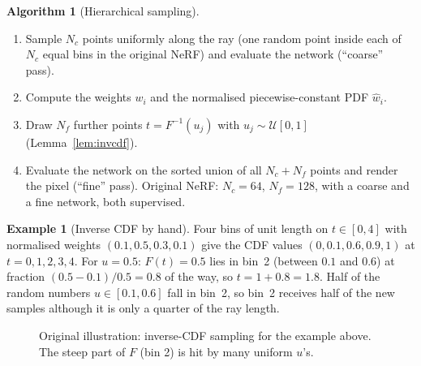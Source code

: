 \documentclass[11pt,a4paper]{article}
\theoremstyle{definition}
\newtheorem{example}[definition]{Example}
\newtheorem{algorithm}{Algorithm}[section]
\theoremstyle{plain}
\theoremstyle{remark}
\begin{document}
\begin{algorithm}[Hierarchical sampling]\label{alg:hier}
\begin{enumerate}[nosep]
\item Sample $N_c$ points uniformly along the ray (one random point inside each of $N_c$ equal bins in the original NeRF) and evaluate the network (``coarse'' pass).
\item Compute the weights $w_i$ and the normalised piecewise-constant PDF $\hat w_i$.
\item Draw $N_f$ further points $t=F^{-1}(u_j)$ with $u_j\sim\mathcal U[0,1]$ (Lemma~\ref{lem:invcdf}).
\item Evaluate the network on the sorted union of all $N_c+N_f$ points and render the pixel (``fine'' pass). Original NeRF: $N_c=64$, $N_f=128$, with a coarse and a fine network, both supervised.
\end{enumerate}
\end{algorithm}

\begin{example}[Inverse CDF by hand]
Four bins of unit length on $t\in[0,4]$ with normalised weights $(0.1,0.5,0.3,0.1)$ give the CDF values $(0,0.1,0.6,0.9,1)$ at $t=0,1,2,3,4$. For $u=0.5$: $F(t)=0.5$ lies in bin~2 (between $0.1$ and $0.6$) at fraction $(0.5-0.1)/0.5=0.8$ of the way, so $t=1+0.8=1.8$. Half of the random numbers $u\in[0.1,0.6]$ fall in bin~2, so bin~2 receives half of the new samples although it is only a quarter of the ray length.
\end{example}

\begin{figure}[H]
\centering
{}
\caption{Original illustration: inverse-CDF sampling for the example above. The steep part of $F$ (bin 2) is hit by many uniform $u$'s.}
\end{figure}
\end{document}
